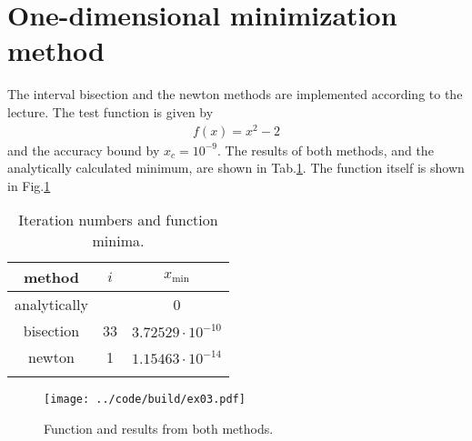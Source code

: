 \section{One-dimensional minimization method}
The interval bisection and the newton methods are implemented according to the lecture. The test function is given by
\begin{align}
    f(x) = x^2 - 2
\end{align}
and the accuracy bound by $x_c = 10^{-9}$. The results of both methods, and the analytically calculated minimum, are shown in Tab.\ref{tab:1}. The function itself is shown in Fig.\ref{fig:ex03}

\begin{table}[h]
	\centering
	\begin{tabular}{ccc}
		\toprule
		method& $i$ &  $x_{\min}$\\
		\midrule
        analytically & & 0\\
        bisection &33&$3.72529 \cdot 10^{-10}$\\
        newton &1& $1.15463 \cdot 10^{-14}$ \\
		\bottomrule \\
	\end{tabular}
	\caption{Iteration numbers and function minima.}
	\label{tab:1}
\end{table}


\begin{figure}[h]
    \centering
    \texttt{[image: ../code/build/ex03.pdf]}
    \caption{Function and results from both methods.}
    \label{fig:ex03}
\end{figure}

